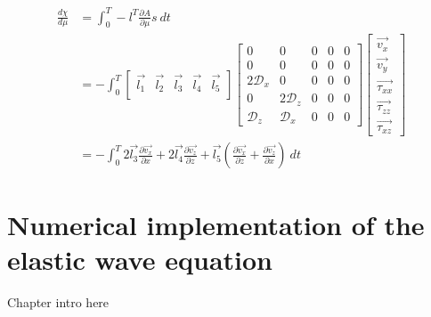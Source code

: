 \documentclass[10pt]{SelfArx} %
\newcommand{\pder}[2][]{\frac{\partial#1}{\partial#2}}
\theoremstyle{definition}
\begin{document}
\begin{equation}
\begin{aligned}
\frac{d\chi}{d\mu} &= \int_0^T - l^T \pder[A]{\mu} s\ dt \\
&=-\int_0^T
 \begin{bmatrix}
\vec{l_1}&\vec{l_2}&\vec{l_3} &\vec{l_4} & \vec{l_5}\\
\end{bmatrix}
 \begin{bmatrix}
0 & 0 & 0 & 0 & 0 \\
0  & 0 & 0&0&0\\
2\mathcal{D}_x & 0 & 0&0&0\\
0 &2\mathcal{D}_z&0&0&0\\
\mathcal{D}_z&\mathcal{D}_x&0&0&0
\end{bmatrix}
\begin{bmatrix}
\vec{{v_x}}\\
\vec{{v_y}}\\
\vec{{\tau_{xx}}}\\
\vec{{\tau_{zz}}}\\
\vec{{\tau_{xz}}}
\end{bmatrix} \\{}
&=-\int_0^T 2\vec{l_3} \pder[\vec{v_x}]{x} + 2\vec{l_4} \pder[\vec{v_z}]{z} + \vec{l_5}\left(\pder[\vec{v_x}]{z} + \pder[\vec{v_z}]{x}\right) \ dt
\end{aligned}
\end{equation}


\section{Numerical implementation of the elastic wave equation}
Chapter intro here
\end{document}

